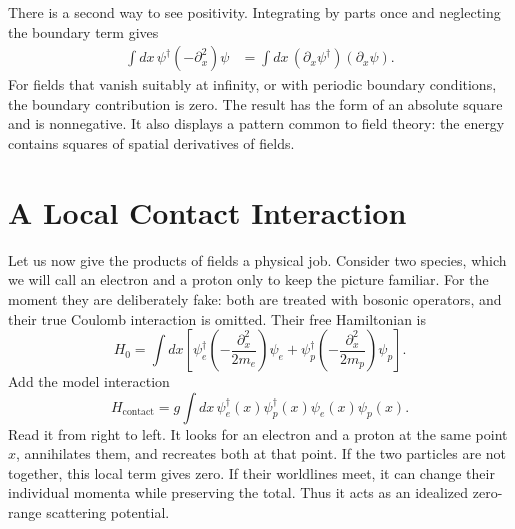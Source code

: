 \begin{classroomqa}
\end{classroomqa}

There is a second way to see positivity. Integrating by parts once and neglecting the boundary term gives
\begin{align}
\int dx\,\psi^\dagger(-\partial_x^2)\psi
&=\int dx\,(\partial_x\psi^\dagger)(\partial_x\psi).
\label{eq:l9-positive-kinetic}
\end{align}
For fields that vanish suitably at infinity, or with periodic boundary conditions, the boundary contribution is zero. The result has the form of an absolute square and is nonnegative. It also displays a pattern common to field theory: the energy contains squares of spatial derivatives of fields.

\section{A Local Contact Interaction}

Let us now give the products of fields a physical job. Consider two species, which we will call an electron and a proton only to keep the picture familiar. For the moment they are deliberately fake: both are treated with bosonic operators, and their true Coulomb interaction is omitted. Their free Hamiltonian is
\begin{equation}
H_0=\int dx\left[
\psi_e^\dagger\left(-\frac{\partial_x^2}{2m_e}\right)\psi_e
+
\psi_p^\dagger\left(-\frac{\partial_x^2}{2m_p}\right)\psi_p
\right].
\end{equation}
Add the model interaction
\begin{equation}
H_{\mathrm{contact}}
=g\int dx\,
\psi_e^\dagger(x)\psi_p^\dagger(x)
\psi_e(x)\psi_p(x).
\label{eq:l9-contact}
\end{equation}
Read it from right to left. It looks for an electron and a proton at the same point \(x\), annihilates them, and recreates both at that point. If the two particles are not together, this local term gives zero. If their worldlines meet, it can change their individual momenta while preserving the total. Thus it acts as an idealized zero-range scattering potential.

